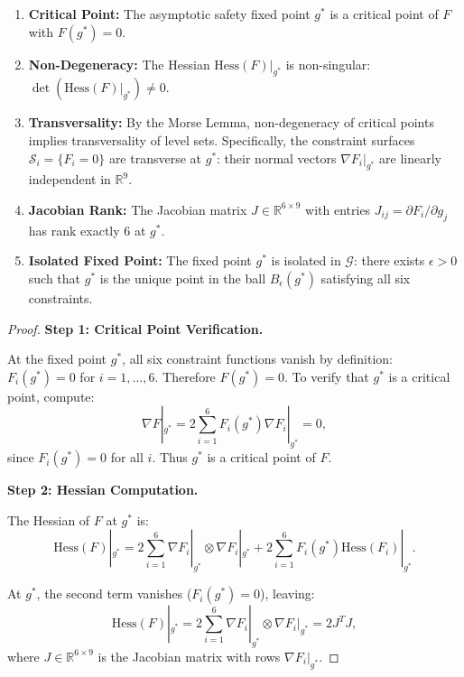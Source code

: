 {\begin{theorem}
\begin{enumerate}
\item \textbf{Critical Point:} The asymptotic safety fixed point $g^*$ is a critical point of $F$ with $F(g^*) = 0$.

\item \textbf{Non-Degeneracy:} The Hessian $\text{Hess}(F)|_{g^*}$ is non-singular: $\det(\text{Hess}(F)|_{g^*}) \neq 0$.

\item \textbf{Transversality:} By the Morse Lemma, non-degeneracy of critical points implies transversality of level sets. Specifically, the constraint surfaces $\mathcal{S}_i = \{F_i = 0\}$ are transverse at $g^*$: their normal vectors $\nabla F_i|_{g^*}$ are linearly independent in $\mathbb{R}^9$.

\item \textbf{Jacobian Rank:} The Jacobian matrix $J \in \mathbb{R}^{6 \times 9}$ with entries $J_{ij} = \partial F_i / \partial g_j$ has rank exactly 6 at $g^*$.

\item \textbf{Isolated Fixed Point:} The fixed point $g^*$ is isolated in $\mathcal{G}$: there exists $\epsilon > 0$ such that $g^*$ is the unique point in the ball $B_\epsilon(g^*)$ satisfying all six constraints.

\end{enumerate}

\end{theorem}

\begin{proof}

\textbf{Step 1: Critical Point Verification.}

At the fixed point $g^*$, all six constraint functions vanish by definition: $F_i(g^*) = 0$ for $i = 1, \ldots, 6$. Therefore $F(g^*) = 0$. To verify that $g^*$ is a critical point, compute:
\begin{equation}
\nabla F|_{g^*} = 2 \sum_{i=1}^6 F_i(g^*) \nabla F_i|_{g^*} = 0,
\end{equation}
since $F_i(g^*) = 0$ for all $i$. Thus $g^*$ is a critical point of $F$.

\textbf{Step 2: Hessian Computation.}

The Hessian of $F$ at $g^*$ is:
\begin{equation}
\text{Hess}(F)|_{g^*} = 2 \sum_{i=1}^6 \nabla F_i|_{g^*} \otimes \nabla F_i|_{g^*} + 2 \sum_{i=1}^6 F_i(g^*) \text{Hess}(F_i)|_{g^*}.
\end{equation}

At $g^*$, the second term vanishes ($F_i(g^*) = 0$), leaving:
\begin{equation}
\text{Hess}(F)|_{g^*} = 2 \sum_{i=1}^6 \nabla F_i|_{g^*} \otimes \nabla F_i|_{g^*} = 2 J^T J,
\end{equation}
where $J \in \mathbb{R}^{6 \times 9}$ is the Jacobian matrix with rows $\nabla F_i|_{g^*}$.


\end{proof}}
